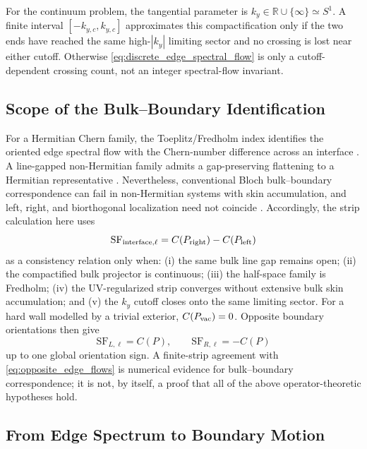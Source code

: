 \documentclass[11pt]{article}
\numberwithin{equation}{section}
\begin{document}
For the continuum problem, the tangential parameter is
$k_y\in\mathbb R\cup\{\infty\}\simeq S^1$.  A finite interval
$[-k_{y,c},k_{y,c}]$ approximates this compactification only if the two
ends have reached the same high-$|k_y|$ limiting sector and no crossing is
lost near either cutoff.  Otherwise
\eqref{eq:discrete_edge_spectral_flow} is only a cutoff-dependent crossing
count, not an integer spectral-flow invariant.

\subsection{Scope of the Bulk--Boundary Identification}

For a Hermitian Chern family, the Toeplitz/Fredholm index identifies the
oriented edge spectral flow with the Chern-number difference across an
interface \cite{Kellendonk2002,GrafPorta2013,ProdanSchulzBaldes2016}.
A line-gapped non-Hermitian family admits a gap-preserving flattening to a
Hermitian representative \cite{Kawabata2019}.  Nevertheless, conventional
Bloch bulk--boundary correspondence can fail in non-Hermitian systems with
skin accumulation, and left, right, and biorthogonal localization need not
coincide \cite{Kunst2018,YaoWang2018}.  Accordingly, the strip calculation
here uses
\begin{equation}
  \mathrm{SF}_{\rm interface,\ell}
  =C(P_{\rm right})-C(P_{\rm left})
  \label{eq:bulk_boundary}
\end{equation}
as a consistency relation only when: (i) the same bulk line gap remains
open; (ii) the compactified bulk projector is continuous; (iii) the
half-space family is Fredholm; (iv) the UV-regularized strip converges
without extensive bulk skin accumulation; and (v) the $k_y$ cutoff closes
onto the same limiting sector.  For a hard wall modelled by a trivial
exterior, $C(P_{\rm vac})=0$.  Opposite boundary orientations then give
\begin{equation}
  \mathrm{SF}_{L,\ell}=C(P),
  \qquad
  \mathrm{SF}_{R,\ell}=-C(P)
  \label{eq:opposite_edge_flows}
\end{equation}
up to one global orientation sign.  A finite-strip agreement with
\eqref{eq:opposite_edge_flows} is numerical evidence for bulk--boundary
correspondence; it is not, by itself, a proof that all of the above
operator-theoretic hypotheses hold.

\subsection{From Edge Spectrum to Boundary Motion}
\end{document}

